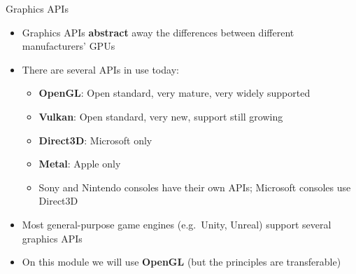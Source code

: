 \begin{frame}{Graphics APIs}
	\begin{itemize}
		\pause\item Graphics APIs \textbf{abstract} away the differences between different manufacturers' GPUs
		\pause\item There are several APIs in use today:
		\begin{itemize}
			\pause\item \textbf{OpenGL}: Open standard, very mature, very widely supported
			\pause\item \textbf{Vulkan}: Open standard, very new, support still growing
			\pause\item \textbf{Direct3D}: Microsoft only
			\pause\item \textbf{Metal}: Apple only
			\pause\item Sony and Nintendo consoles have their own APIs; Microsoft consoles use Direct3D
		\end{itemize}
		\pause\item Most general-purpose game engines (e.g.\ Unity, Unreal) support several graphics APIs
		\pause\item On this module we will use \textbf{OpenGL} (but the principles are transferable)
	\end{itemize}
\end{frame}

